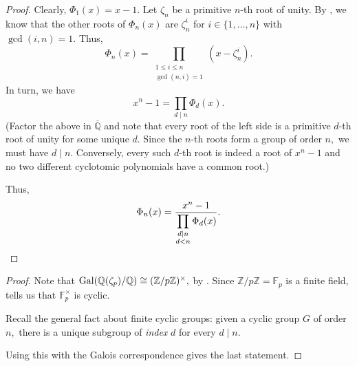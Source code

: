\cycloreccurence*\label{thm:cycloreccurence2}
\begin{flushright}\hyperref[thm:cycloreccurence]{\upsym}\end{flushright}
\begin{proof}
    Clearly, $\Phi_1(x) = x - 1.$ Let $\zeta_n$ be a primitive $n$-th root of unity. By , we know that the other roots of $\Phi_n(x)$ are $\zeta_n^i$ for $i \in \{1, \ldots, n\}$ with $\gcd(i, n) = 1.$ Thus,
    \begin{equation*} 
        \Phi_n(x) = \prod_{\substack{1 \le i \le n \\ \gcd(n, i) = 1}}(x - \zeta_n^i).
    \end{equation*}
    In turn, we have
    \begin{equation*} 
        x^n - 1 = \prod_{d \mid n} \Phi_d(x).
    \end{equation*}
    (Factor the above in $\overline{\mathbb{Q}}$ and note that every root of the left side is a primitive $d$-th root of unity for some unique $d.$ Since the $n$-th roots form a group of order $n,$ we must have $d \mid n.$ Conversely, every such $d$-th root is indeed a root of $x^n - 1$ and no two different cyclotomic polynomials have a common root.)

    Thus,
    \begin{equation*} 
        \Phi_n(x) = \frac{x^n - 1}{\displaystyle\prod_{\substack{d \mid n\\ d < n}} \Phi_d(x)}. \qedhere
    \end{equation*}
\end{proof}

\cyclocyclic*\label{prop:cyclocyclic2}
\begin{flushright}\hyperref[prop:cyclocyclic]{\upsym}\end{flushright}
\begin{proof}
    Note that $\operatorname{Gal}(\mathbb{Q}(\zeta_p)/\mathbb{Q}) \cong (\mathbb{Z}/p\mathbb{Z})^\times,$  by . Since $\mathbb{Z}/p\mathbb{Z} = \mathbb{F}_p$ is a finite field,  tells us that $\mathbb{F}_p^\times$ is cyclic.

    Recall the general fact about finite cyclic groups: given a cyclic group $G$ of order $n,$ there is a unique subgroup of \emph{index} $d$ for every $d \mid n.$ 

    Using this with the Galois correspondence gives the last statement.
\end{proof}

